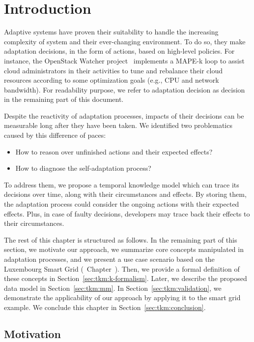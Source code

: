 \section{Introduction}

Adaptive systems have proven their suitability to handle the increasing complexity of system and their ever-changing environment.
To do so, they make adaptation decisions, in the form of actions, based on high-level policies. 
For instance, the OpenStack Watcher project~\cite{OpenStack:Watcher:Wiki} implements a MAPE-k loop to assist cloud administrators in their activities to tune and rebalance their cloud resources according to some optimization goals (e.g., CPU and network bandwidth). 
For readability purpose, we refer to adaptation decision as decision in the remaining part of this document.

Despite the reactivity of adaptation processes, impacts of their decisions can be measurable long after they have been taken.
We identified two problematics caused by this difference of paces:
\begin{itemize}
	\item How to reason over unfinished actions and their expected effects?
	\item How to diagnose the self-adaptation process?
\end{itemize}

To address them, we propose a temporal knowledge model which can trace its decisions over time, along with their circumstances and effects.
By storing them, the adaptation process could consider the ongoing actions with their expected effects.
Plus, in case of faulty decisions, developers may trace back their effects to their circumstances.

The rest of this chapter is structured as follows.
In the remaining part of this section, we motivate our approach, we summarize core concepts manipulated in adaptation processes, and we present a use case scenario based on the Luxembourg Smart Grid (\cf~Chapter~).
Then, we provide a formal definition of these concepts in Section~\ref{sec:tkm:k-formalism}.
Later, we describe the proposed data model in Section~\ref{sec:tkm:mm}.
In Section~\ref{sec:tkm:validation}, we demonstrate the applicability of our approach by applying it to the smart grid example.
We conclude this chapter in Section~\ref{sec:tkm:conclusion}.

\subsection{Motivation}

